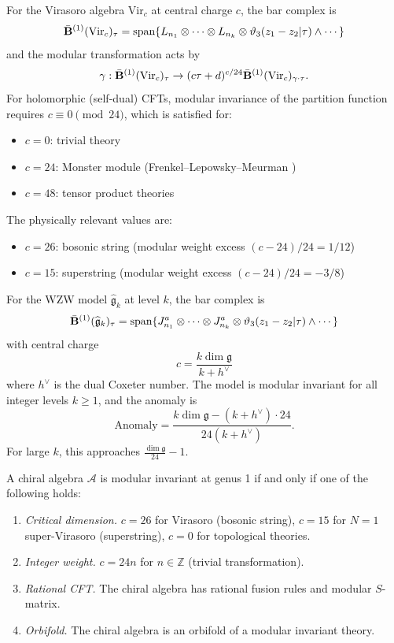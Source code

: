 \begin{example}
For the Virasoro algebra $\text{Vir}_c$ at central charge $c$, the bar complex is
\[\bar{\mathbf{B}}^{(1)}(\text{Vir}_c)_\tau = \text{span}\{L_{n_1} \otimes \cdots \otimes L_{n_k} \otimes \vartheta_3(z_1-z_2|\tau) \wedge \cdots\}\]
and the modular transformation acts by
\[\gamma: \bar{\mathbf{B}}^{(1)}(\text{Vir}_c)_\tau \to (c\tau + d)^{c/24} \bar{\mathbf{B}}^{(1)}(\text{Vir}_c)_{\gamma \cdot \tau}.\]
For holomorphic (self-dual) CFTs, modular invariance of the partition function requires $c \equiv 0 \pmod{24}$, which is satisfied for:
\begin{itemize}
\item $c = 0$: trivial theory
\item $c = 24$: Monster module (Frenkel--Lepowsky--Meurman \cite{FLM88})
\item $c = 48$: tensor product theories
\end{itemize}
The physically relevant values are:
\begin{itemize}
\item $c = 26$: bosonic string (modular weight excess $(c-24)/24 = 1/12$)
\item $c = 15$: superstring (modular weight excess $(c-24)/24 = -3/8$)
\end{itemize}
\end{example}

\begin{example}
For the WZW model $\widehat{\mathfrak{g}}_k$ at level $k$, the bar complex is
\[\bar{\mathbf{B}}^{(1)}(\widehat{\mathfrak{g}}_k)_\tau = \text{span}\{J^a_{n_1} \otimes \cdots \otimes J^a_{n_k} \otimes \vartheta_3(z_1-z_2|\tau) \wedge \cdots\}\]
with central charge
\[c = \frac{k \dim \mathfrak{g}}{k + h^\vee}\]
where $h^\vee$ is the dual Coxeter number.
The model is modular invariant for all integer levels $k \geq 1$, and the anomaly is
\[\text{Anomaly} = \frac{k \dim \mathfrak{g} - (k + h^\vee) \cdot 24}{24(k + h^\vee)}.\]
For large $k$, this approaches $\frac{\dim \mathfrak{g}}{24} - 1$.
\end{example}

\begin{theorem}\label{thm:modular-classification}
A chiral algebra $\mathcal{A}$ is modular invariant at genus 1 if and only if one of the following holds:

\begin{enumerate}
\item \emph{Critical dimension.} $c = 26$ for Virasoro (bosonic string), $c = 15$ for $N=1$ super-Virasoro (superstring), $c = 0$ for topological theories.
\item \emph{Integer weight.} $c = 24n$ for $n \in \mathbb{Z}$ (trivial transformation).
\item \emph{Rational CFT.} The chiral algebra has rational fusion rules and modular $S$-matrix.
\item \emph{Orbifold.} The chiral algebra is an orbifold of a modular invariant theory.
\end{enumerate}
\end{theorem}


